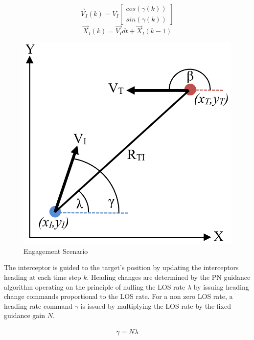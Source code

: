 \documentclass[conference]{IEEEtran}
\begin{document}
\begin{equation}\label{eq:intkin}
\overrightarrow{V}_{I}(k) =  V_{I} \begin{bmatrix} cos(\gamma(k)) \\ sin(\gamma(k)) \end{bmatrix}
\end{equation}
\begin{equation}\label{eq:intkintwo}
\overrightarrow{X}_I(k) =  \overrightarrow{V_I}dt + \overrightarrow{X}_I(k-1) 
\end{equation}





\begin{figure}[H]
	\centering
	\includegraphics[width=6 cm]{Engagement_Model.PNG}
	\caption{Engagement Scenario}
	\label{fig:Egagement}
\end{figure}

The interceptor is guided to the target's position by updating the interceptors heading at each time step $k$. Heading changes are determined by the PN guidance algorithm operating on the principle of nulling the LOS rate $\dot{\lambda}$ by issuing heading change commands proportional to the LOS rate. For a non zero LOS rate, a heading rate command $\dot{\gamma}$ is issued by multiplying the LOS rate by the fixed guidance gain $N$.

\begin{equation} \label{eq:PNlaw}
\dot{\gamma} = N\dot{\lambda}
\end{equation}
\end{document}
